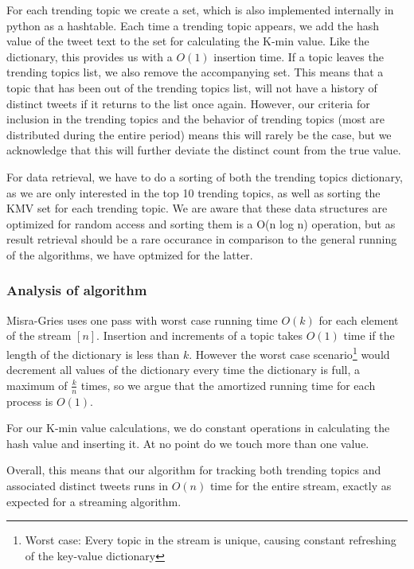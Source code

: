 For each trending topic we create a set, which is also implemented internally in python as a hashtable. Each time a trending topic appears, we add the hash value of the tweet text to the set for calculating the K-min value. Like the dictionary, this provides us with a $O(1)$ insertion time. If a topic leaves the trending topics list, we also remove the accompanying set. This means that a topic that has been out of the trending topics list, will not have a history of distinct tweets if it returns to the list once again. However, our criteria for inclusion in the trending topics and the behavior of trending topics (most are distributed during the entire period) means this will rarely be the case, but we acknowledge that this will further deviate the distinct count from the true value.

For data retrieval, we have to do a sorting of both the trending topics dictionary, as we are only interested in the top 10 trending topics, as well as sorting the KMV set for each trending topic. We are aware that these data structures are optimized for random access and sorting them is a O(n log n) operation, but as result retrieval should be a rare occurance in comparison to the general running of the algorithms, we have optmized for the latter.

\subsubsection{Analysis of algorithm}
\label{algo-analysis}
Misra-Gries uses one pass with worst case running time $O(k)$ for each element of the stream $[n]$. Insertion and increments of a topic takes $O(1)$ time if the length of the dictionary is less than $k$. However the worst case scenario\footnote{Worst case: Every topic in the stream is unique, causing constant refreshing of the key-value dictionary} would decrement all values of the dictionary every time the dictionary is full, a maximum of $\frac{k}{n}$ times, so we argue that the amortized running time for each process is $O(1)$.

For our K-min value calculations, we do constant operations in calculating the hash value and inserting it. At no point do we touch more than one value.

Overall, this means that our algorithm for tracking both trending topics and associated distinct tweets runs in $O(n)$ time for the entire stream, exactly as expected for a streaming algorithm.
